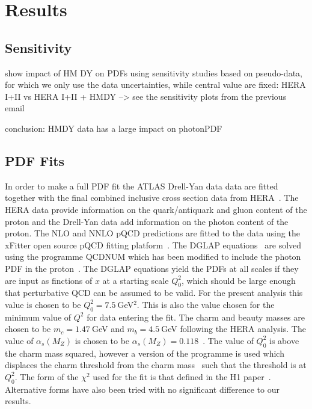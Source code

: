 \section{Results}

\subsection{Sensitivity}
 show impact of HM DY on PDFs using sensitivity studies based on
pseudo-data, for which we only use the data uncertainties, while central 
value are fixed:
 HERA I+II vs HERA I+II + HMDY --> see the sensitivity plots from the previous email


conclusion: HMDY data has a large impact on photonPDF 



\subsection{PDF Fits}

In order to make a full PDF fit the  ATLAS Drell-Yan data data are fitted together with the final combined inclusive 
cross section data from HERA~\cite{hera}. The HERA data provide information on the quark/antiquark and gluon content of 
the proton and the Drell-Yan data add information on the photon content of the proton. 
The NLO and NNLO pQCD predictions are fitted to the data using the xFitter open source pQCD fitting platform~\cite{xFitter}.
The DGLAP equations~\cite{dglap} are solved using the programme QCDNUM which has been modified to include 
the photon PDF in the proton~\cite{qcdnum}.
The DGLAP equations yield the PDFs at all scales if they are input as finctions of $x$ at a starting scale $Q^2_0$, which 
should be large enough that perturbative QCD can be assumed to be valid. For the present analysis this value is chosen
to be $Q^2_0 = 7.5~$GeV$^2$. This is also the value chosen for the minimum value of $Q^2$ for data entering the fit.
The charm and beauty masses are chosen to be $m_c=1.47~$GeV and $m_b=4.5~$GeV following the HERA analysis. 
The value of $\alpha_s(M_Z)$ is chosen to be $\alpha_s(M_Z)=0.118$~\cite{PDG}. 
The value of $Q^2_0$ is above the charm mass squared, however a version of the programme 
is used which displaces the charm threshold from the charm mass~\cite{charmthresh} such that the threshold is at $Q^2_0$.
The form of the $\chi^2$ used for the fit is that defined in the H1 paper~\cite{h1chisqdef}. 
Alternative forms have also been tried with no significant difference to our results.
 
